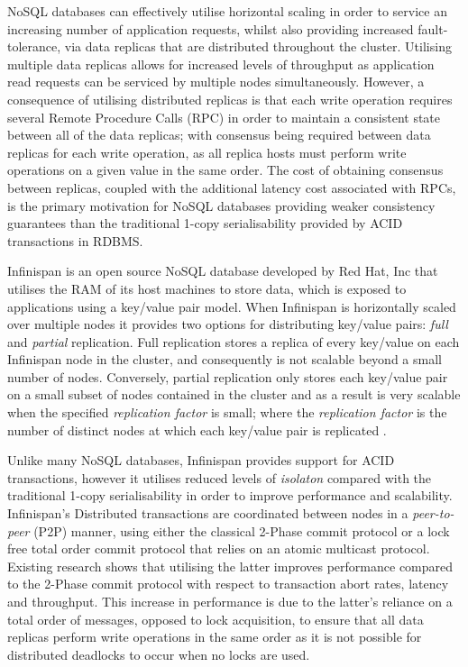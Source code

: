     NoSQL databases can effectively utilise horizontal scaling in order to service an increasing number of application requests, whilst also providing increased fault-tolerance, via data replicas that are distributed throughout the cluster.  Utilising multiple data replicas allows for increased levels of throughput as application read requests can be serviced by multiple nodes simultaneously.  However, a consequence of utilising distributed replicas is that each write operation requires several Remote Procedure Calls (RPC) in order to maintain a consistent state between all of the data replicas; with consensus being required between data replicas for each write operation, as all replica hosts must perform write operations  on a given value in the same order.  The cost of obtaining consensus between replicas, coupled with the additional latency cost associated with RPCs, is the primary motivation for NoSQL databases providing weaker consistency guarantees than the traditional 1-copy serialisability provided by ACID transactions in RDBMS.  
    
    Infinispan \citep{Infinispan} is an open source NoSQL database developed by Red Hat, Inc \citep{RedHat} that utilises the RAM of its host machines to store data, which is exposed to applications using a key/value pair model.  When Infinispan is horizontally scaled over multiple nodes it provides two options for distributing key/value pairs: \emph{full} and \emph{partial} replication.  Full replication stores a replica of every key/value on each Infinispan node in the cluster, and consequently is not scalable beyond a small number of nodes.  Conversely, partial replication only stores each key/value pair on a small subset of nodes contained in the cluster and as a result is very scalable when the specified \emph{replication factor} is small; where the \emph{replication factor} is the number of distinct nodes at which each key/value pair is replicated \citep{Schiper:2010:PGP:1915085.1916444}.  
    
    Unlike many NoSQL databases, Infinispan provides support for ACID transactions, however it utilises reduced levels of \emph{isolaton} compared with the traditional 1-copy serialisability in order to improve performance and scalability.  Infinispan's Distributed transactions are coordinated between nodes in a \emph{peer-to-peer} (P2P) manner, using either the classical 2-Phase commit protocol or a lock free total order commit protocol that relies on an atomic multicast protocol.  Existing research \citep{Ruivo:2011:ETO:2120967.2121604} shows that utilising the latter improves performance compared to the 2-Phase commit protocol with respect to transaction abort rates, latency and throughput.  This increase in performance is due to the latter's reliance on a total order of messages, opposed to lock acquisition, to ensure that all data replicas perform write operations in the same order as it is not possible for distributed deadlocks to occur when no locks are used.  
    
